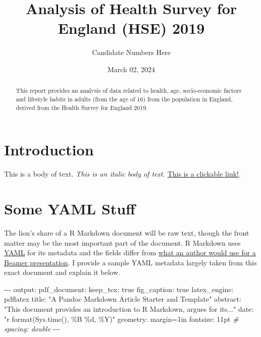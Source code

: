 \documentclass[
  11pt,
]{article}
\title{Analysis of Health Survey for England (HSE) 2019}
\author{Candidate Numbers Here}
\date{March 02, 2024}
\newenvironment{Shaded}{\begin{snugshade}}{\end{snugshade}}
\newcommand{\CommentTok}[1]{\textcolor[rgb]{0.56,0.35,0.01}{\textit{#1}}}
\newcommand{\NormalTok}[1]{#1}
\newcommand{\OtherTok}[1]{\textcolor[rgb]{0.56,0.35,0.01}{#1}}
\newcommand{\SpecialCharTok}[1]{\textcolor[rgb]{0.00,0.00,0.00}{#1}}
\newcommand{\StringTok}[1]{\textcolor[rgb]{0.31,0.60,0.02}{#1}}
\begin{document}
\maketitle
\begin{abstract}
This report provides an analysis of data related to health, age,
socio-economic factors and lifestyle habits in adults (from the age of
16) from the population in England, derived from the Health Survey for
England 2019.
\end{abstract}

\newpage

\hypertarget{introduction}{%
\section{Introduction}\label{introduction}}

This is a body of text. \emph{This is an italic body of text.}
\href{https://google.com}{This is a clickable link!}.

\hypertarget{some-yaml-stuff}{%
\section{Some YAML Stuff}\label{some-yaml-stuff}}

The lion's share of a R Markdown document will be raw text, though the
front matter may be the most important part of the document. R Markdown
uses \href{http://www.yaml.org/}{YAML} for its metadata and the fields
differ from
\href{http://svmiller.com/blog/2015/02/moving-from-beamer-to-r-markdown/}{what
an author would use for a Beamer presentation}. I provide a sample YAML
metadata largely taken from this exact document and explain it below.

\begin{Shaded}
\begin{Highlighting}[]
\SpecialCharTok{{-}{-}{-}}
\NormalTok{output}\SpecialCharTok{:} 
\NormalTok{  pdf\_document}\SpecialCharTok{:}
\NormalTok{    keep\_tex}\SpecialCharTok{:}\NormalTok{ true}
\NormalTok{    fig\_caption}\SpecialCharTok{:}\NormalTok{ true}
\NormalTok{    latex\_engine}\SpecialCharTok{:}\NormalTok{ pdflatex}
\NormalTok{title}\SpecialCharTok{:} \StringTok{"A Pandoc Markdown Article Starter and Template"}
\NormalTok{abstract}\SpecialCharTok{:} \StringTok{"This document provides an introduction to R Markdown, argues for its..."}
\NormalTok{date}\SpecialCharTok{:} \StringTok{"\textasciigrave{}r format(Sys.time(), \textquotesingle{}\%B \%d, \%Y\textquotesingle{})\textasciigrave{}"}
\NormalTok{geometry}\SpecialCharTok{:}\NormalTok{ margin}\OtherTok{=}\NormalTok{1in}
\NormalTok{fontsize}\SpecialCharTok{:}\NormalTok{ 11pt}
\CommentTok{\# spacing: double}
\SpecialCharTok{{-}{-}{-}}
\end{Highlighting}
\end{Shaded}
\end{document}
